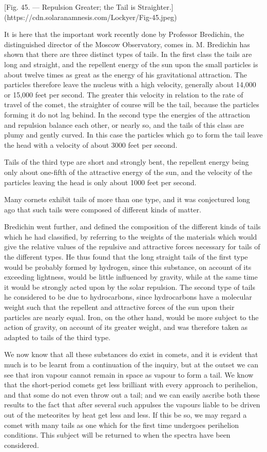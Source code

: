 \documentclass[a4paper, 12pt, oneside, polutonikogreek, english]{article}
\begin{document}
[Fig. 45. --- Repulsion Greater; the Tail is Straighter.](https://cdn.solaranamnesis.com/Lockyer/Fig-45.jpeg)

It is here that the important work recently done by Professor Bredichin, the distinguished director of the Moscow Observatory, comes in. M. Bredichin has shown that there are three distinct types of tails. In the first class the tails are long and straight, and the repellent energy of the sun upon the small particles is about twelve times as great as the energy of his gravitational attraction. The particles therefore leave the nucleus with a high velocity, generally about 14,000 or 15,000 feet per second. The greater this velocity in relation to the rate of travel of the comet, the straighter of course will be the tail, because the particles forming it do not lag behind. In the second type the energies of the attraction and repulsion balance each other, or nearly so, and the tails of this class are plumy and gently curved. In this case the particles which go to form the tail leave the head with a velocity of about 3000 feet per second.

Tails of the third type are short and strongly bent, the repellent energy being only about one-fifth of the attractive energy of the sun, and the velocity of the particles leaving the head is only about 1000 feet per second.

Many cornets exhibit tails of more than one type, and it was conjectured long ago that such tails were composed of different kinds of matter.

Bredichin went further, and defined the composition of the different kinds of tails which he had classified, by referring to the weights of the materials which would give the relative values of the repulsive and attractive forces necessary for tails of the different types. He thus found that the long straight tails of the first type would be probably formed by hydrogen, since this substance, on account of its exceeding lightness, would be little influenced by gravity, while at the same time it would be strongly acted upon by the solar repulsion. The second type of tails he considered to be due to hydrocarbons, since hydrocarbons have a molecular weight such that the repellent and attractive forces of the sun upon their particles are nearly equal. Iron, on the other hand, would be more subject to the action of gravity, on account of its greater weight, and was therefore taken as adapted to tails of the third type.

We now know that all these substances do exist in comets, and it is evident that much is to be learnt from a continuation of the inquiry, but at the outset we can see that iron vapour cannot remain in space as vapour to form a tail. We know that the short-period comets get less brilliant with every approach to perihelion, and that some do not even throw out a tail; and we can easily ascribe both these results to the fact that after several such appulses the vapours liable to be driven out of the meteorites by heat get less and less. If this be so, we may regard a comet with many tails as one which for the first time undergoes perihelion conditions. This subject will be returned to when the spectra have been considered.
\end{document}
